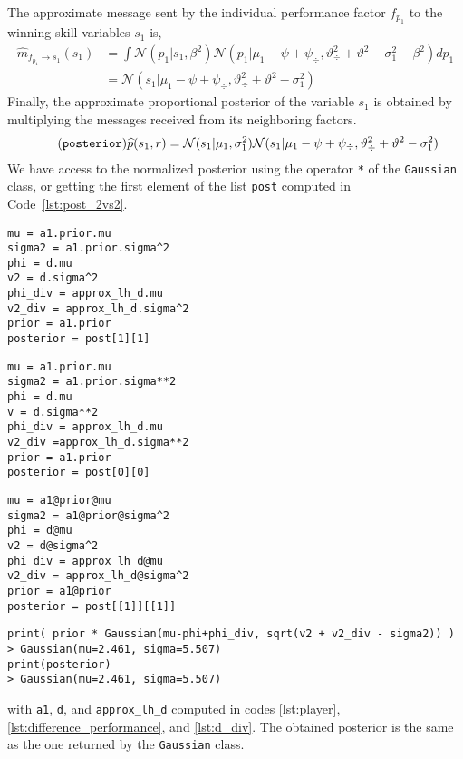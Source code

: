 \documentclass[article]{jss}
\newcommand{\N}{\mathcal{N}}
\begin{document}
%
The approximate message sent by the individual performance factor $f_{p_1}$ to the winning skill variables $s_1$ is,
%
\begin{equation}%
\begin{split}
\widehat{m}_{f_{p_1} \rightarrow s_1}(s_1) & = \int \N(p_1|s_1,\beta^2) \N(p_1| \mu_1 - \psi + \psi_{\div}, \vartheta_{\div}^2 + \vartheta^2 - \sigma_1^2 - \beta^2)dp_1 \\
& = \N(s_1| \mu_1 - \psi + \psi_{\div}, \vartheta_{\div}^2 + \vartheta^2 - \sigma_1^2)
\end{split}
\end{equation}
%
Finally, the approximate proportional posterior of the variable $s_1$ is obtained by multiplying the messages received from its neighboring factors. 
%
\begin{equation}\label{eq:^p_s} \tag{\texttt{posterior}}
 \widehat{p}(s_1, r) = \N(s_1|\mu_1, \sigma_1^2) \N(s_1| \mu_1 - \psi + \psi_{\div}, \vartheta_{\div}^2 + \vartheta^2 - \sigma_1^2)
\end{equation}
%
We have access to the normalized posterior using the operator \texttt{*} of the \texttt{Gaussian} class, or getting the first element of the list \texttt{post} computed in Code~\ref{lst:post_2vs2}. 
%
\begin{paracol}{3}
\begin{lstlisting}[backgroundcolor=\color{julia!60},belowskip=-0.77 \baselineskip]
mu = a1.prior.mu
sigma2 = a1.prior.sigma^2
phi = d.mu
v2 = d.sigma^2
phi_div = approx_lh_d.mu
v2_div = approx_lh_d.sigma^2
prior = a1.prior
posterior = post[1][1]
\end{lstlisting}
\switchcolumn
\begin{lstlisting}[backgroundcolor=\color{python!60},belowskip=-0.77 \baselineskip]
mu = a1.prior.mu
sigma2 = a1.prior.sigma**2
phi = d.mu
v = d.sigma**2
phi_div = approx_lh_d.mu
v2_div =approx_lh_d.sigma**2
prior = a1.prior
posterior = post[0][0]
\end{lstlisting}
\switchcolumn
\begin{lstlisting}[backgroundcolor=\color{r!50},belowskip=-0.77 \baselineskip]
mu = a1@prior@mu
sigma2 = a1@prior@sigma^2
phi = d@mu
v2 = d@sigma^2
phi_div = approx_lh_d@mu
v2_div = approx_lh_d@sigma^2
prior = a1@prior
posterior = post[[1]][[1]]
\end{lstlisting}
\end{paracol}
\begin{lstlisting}[captionpos=b,backgroundcolor=\color{all},label=lst:posterior_s1_approx, caption={Accessing the approximate posterior.},belowskip=0cm]
print( prior * Gaussian(mu-phi+phi_div, sqrt(v2 + v2_div - sigma2)) )
> Gaussian(mu=2.461, sigma=5.507)
print(posterior)
> Gaussian(mu=2.461, sigma=5.507)
\end{lstlisting}
%
with \texttt{a1}, \texttt{d}, and \texttt{approx\_lh\_d} computed in codes \ref{lst:player}, \ref{lst:difference_performance}, and \ref{lst:d_div}. 
The obtained posterior is the same as the one returned by the \texttt{Gaussian} class. 
\end{document}
